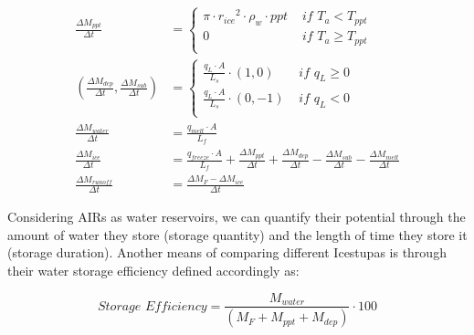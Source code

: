 \documentclass[utf8]{frontiersSCNS} %
\begin{document}
\begin{subequations}
\label{equations}
\begin{align}
    \label{eq:ppt} 
    \frac{\Delta M_{ppt}}{\Delta t}  &= \left\{ \begin{array}{ll} \pi \cdot {r_{ice}}^2 \cdot
\rho_{w}\cdot ppt& \textit{ if } T_{a} < T_{ppt} \\ 0 & \textit{ if } T_{a} \geq T_{ppt} \\ \end{array} \right. \\
    \label{eq:vap} 
            (\frac{\Delta M_{dep}}{\Delta t}, \frac{\Delta M_{sub}}{\Delta t}) &= \left\{ \begin{array}{ll} \frac{q_{L}
                        \cdot A}{L_s}\cdot (1,0)& \textit{ if } q_{L} \geq 0 \\ \frac{q_{L}
            \cdot A}{L_s}\cdot (0,-1) & \textit{ if } q_{L} < 0 \\ \end{array} \right. \\
    \label{eq:mwat} 
            \frac{\Delta M_{water}}{\Delta t} &= \frac{q_{melt} \cdot A }{L_f}\\
    \label{eq:mice} 
    \frac{\Delta M_{ice}}{\Delta t} &= \frac{q_{freeze}\cdot A }{L_f} + \frac{\Delta M_{ppt}}{\Delta t} + \frac{\Delta
    M_{dep}}{\Delta t}- \frac{\Delta M_{sub}}{\Delta t}- \frac{\Delta M_{melt}}{\Delta t} \\
    \label{eq:mftn} 
        \frac{\Delta M_{runoff}}{\Delta t} &= \frac{\Delta M_{F} - \Delta M_{ice}}{\Delta t}
\end{align}
\end{subequations}

Considering AIRs as water reservoirs, we can quantify their potential through the amount of water they store (storage
quantity) and the length of time they store it (storage duration). Another means of comparing different Icestupas is
through their water storage efficiency defined accordingly as:

\begin{equation} \textit{Storage Efficiency} = \frac{M_{water}}{(M_F+M_{ppt}+M_{dep})} \cdot 100 \end{equation}
\end{document}
